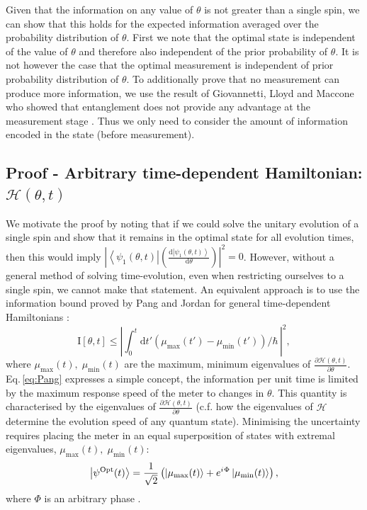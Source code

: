 \documentclass[reqno]{amsart}
\def\be{\begin{equation}}
\def\ee{\end{equation}}
\newcommand{\ket}[1]{\left| #1 \right>}
\newcommand{\bra}[1]{\left< #1 \right|}
\newcommand{\hham}{\mathcal{H}}
\newcommand{\iu}{{i\mkern1mu}}
\def\func#1#2{\mathrm{#1}\left[#2\right]}
\begin{document}
Given that the information on any value of $\theta$ is not greater than a single spin, we can show that this holds for the expected information averaged over the probability distribution of $\theta$. First we note that the optimal state is independent of the value of $\theta$ and therefore also independent of the prior probability of $\theta$. It is not however the case that the optimal measurement is independent of prior probability distribution of $\theta$. To additionally prove that no measurement can produce more information, we use the result of Giovannetti, Lloyd and Maccone who showed that entanglement does not provide any advantage at the measurement stage \cite{Giovannetti2006}. Thus we only need to consider the amount of information encoded in the state (before measurement).\\

\subsection{Proof - Arbitrary time-dependent Hamiltonian: $\hham(\theta, t)$}\label{App:General}
We motivate the proof by noting that if we could solve the unitary evolution of a single spin and show that it remains in the optimal state for all evolution times, then this would imply $\left|\bra{\psi_1(\theta,t)}\left(\frac{\mathrm{d}\ket{\psi_1(\theta,t)}}{\mathrm{d} \theta}\right)\right|^2 = 0$. However, without a general method of solving time-evolution, even when restricting ourselves to a single spin, we cannot make that statement. An equivalent approach is to use the information bound proved by Pang and Jordan for general time-dependent Hamiltonians \cite{Pang2017}:
\be
\func{I}{\theta,t} \leq \left| \int^t_{0} \mathrm{d}t' \left(\mu_{\mathrm{max}}(t') - \mu_{\mathrm{min}}(t')\right)/\hbar \,\right|^{2},
\label{eq:Pang}
\ee
where $\mu_{\mathrm{max}}(t), \; \mu_{\mathrm{min}}(t)$ are the maximum, minimum eigenvalues of $\frac{\partial \hham(\theta,t)}{\partial \theta}$. Eq.\,\eqref{eq:Pang} expresses a simple concept, the information per unit time is limited by the maximum response speed of the meter to changes in $\theta$. This quantity is characterised by the eigenvalues of $\frac{\partial \hham(\theta,t)}{\partial \theta}$ (c.f. how the eigenvalues of $\hham$ determine the evolution speed of any quantum state). Minimising the uncertainty requires placing the meter in an equal superposition of states with extremal eigenvalues, $\mu_{\mathrm{max}}(t), \; \mu_{\mathrm{min}}(t)$:
\[
\ket{\psi^{\mathrm{Opt}}(t)} = \frac{1}{\sqrt{2}}\left(\ket{\mu_{\mathrm{max}}(t)} + e^{\iu \Phi}\ket{\mu_{\mathrm{min}}(t)}\right),
\]
where $\Phi$ is an arbitrary phase \cite{Braunstein1996, Giovannetti2006, Childs2000}.
\end{document}
